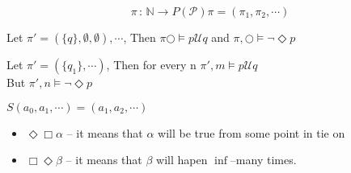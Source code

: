     {
        \begin{equation}
            \pi \,:\,\mathbb{N} \longrightarrow P(\mathcal{P})  \pi = (\pi_1,\pi_2,\cdots )
        \end{equation}
        \begin{myproof}
            Let $\pi' = (\{q\}, \emptyset, \emptyset ),\cdots $, Then $\pi \bigcirc \vDash p \mathcal{U} q$ and $\pi,\bigcirc \vDash \neg \Diamond p$
         
        \end{myproof}
        \begin{myproof}
            Let $\pi' = (\{q_1\},\cdots )$, Then for every n $\pi', m \vDash p \mathcal{U} q$ \\
            But $\pi',n \vDash  \neg \Diamond p$
            
                
        \end{myproof}
    }



    {
        $S(a_0,a_1,\cdots ) = (a_1,a_2,\cdots )$
    }
    

   {
       \begin{itemize}
               \item $\Diamond \Box \alpha$ -- it means that $\alpha$ will be true from some point in tie on
               
               \item $\Box \Diamond \beta$ -- it means that $\beta$ will hapen  $\inf$--many times.
       \end{itemize}
   }




